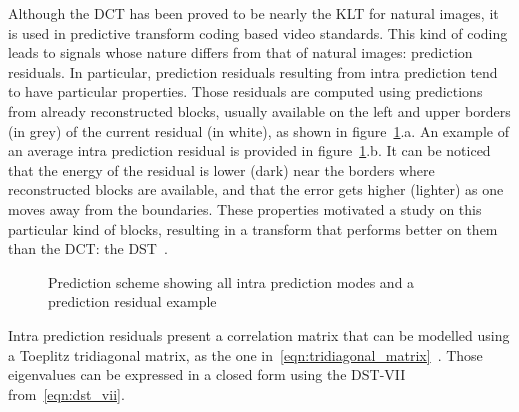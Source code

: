\documentclass[11pt,a4paper,openright,twoside]{book}
\numberwithin{equation}{section} %
\numberwithin{figure}{section} %
\numberwithin{table}{section} %
\begin{document}
Although the \ac{DCT} has been proved to be nearly the \ac{KLT} for natural
images, it is used in predictive transform coding based video standards.
This kind of coding leads to signals whose nature differs from that of
natural images: prediction residuals.
In particular, prediction residuals resulting from intra prediction tend
to have particular properties.
Those residuals are computed using predictions from already
reconstructed blocks, usually available on the left and upper borders (in
grey) of the current residual (in white), as shown in
figure~\ref{fig:pred_scheme}.a.
An example of an average intra prediction residual is provided in
figure~\ref{fig:pred_scheme}.b.
It can be noticed that the energy of the residual is lower (dark) near
the borders where reconstructed blocks are available, and that the error
gets higher (lighter) as one moves away from the boundaries.
These properties motivated a study on this particular kind of blocks,
resulting in a transform that performs better on them than the \ac{DCT}:
the \acf{DST}~\cite{han-10-spatial-adaptive-transform}.
\begin{figure}[tb]
	\centering
	\hspace{0.2\linewidth}
	\caption{Prediction scheme showing all intra prediction modes and a
	prediction residual example}
	\label{fig:pred_scheme}
\end{figure}

Intra prediction residuals present a correlation matrix that can be modelled
using a Toeplitz tridiagonal matrix, as the one
in~\eqref{eqn:tridiagonal_matrix}~\cite{han-10-spatial-adaptive-transform,
yueh-05-eigenvalues-tridiagonal}.
Those eigenvalues can be expressed in a closed form using the \ac{DST}-VII
from~\eqref{eqn:dst_vii}.
\end{document}
